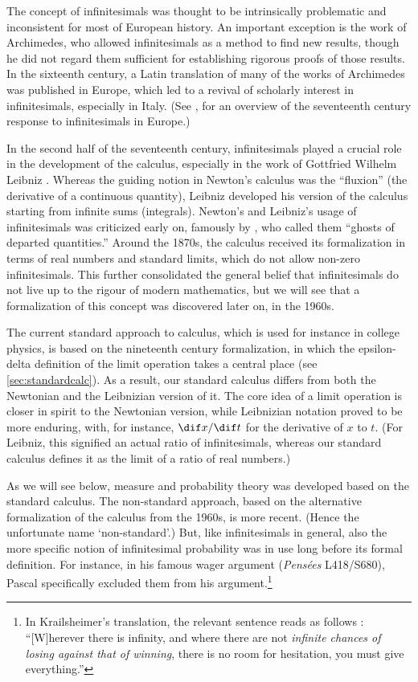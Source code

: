 The concept of infinitesimals was thought to be intrinsically problematic and inconsistent for most of European history. An important exception is the work of Archimedes, who allowed infinitesimals as a method to find new results, though he did not regard them sufficient for establishing rigorous proofs of those results. In the sixteenth century, a Latin translation of many of the works of Archimedes was published in Europe, which led to a revival of scholarly interest in infinitesimals, especially in Italy. (See \citealp{Alexander:2014}, for an overview of the seventeenth century response to infinitesimals in Europe.)

In the second half of the seventeenth century, infinitesimals played a crucial role in the development of the calculus, especially in the work of Gottfried Wilhelm Leibniz \citep[see, \textit{e.g.},][]{KatzSherry:2012a,KatzSherry:2013}.
Whereas the guiding notion in Newton's calculus was the ``fluxion'' (the derivative of a continuous quantity), Leibniz developed his version of the calculus starting from infinite sums (integrals). Newton's and Leibniz's usage of infinitesimals was criticized early on, famously by \citet{Berkeley:1734}, who called them ``ghosts of departed quantities.''
Around the 1870s, the calculus received its formalization in terms of real numbers and standard limits, which do not allow non-zero infinitesimals. This further consolidated the general belief that infinitesimals do not live up to the rigour of modern mathematics, but we will see that a formalization of this concept was discovered later on, in the 1960s.

The current standard approach to calculus, which is used for instance in college physics, is based on the nineteenth century formalization, in which the epsilon-delta definition of the limit operation takes a central place (see \autoref{sec:standardcalc}). As a result, our standard calculus differs from both the Newtonian and the Leibnizian version of it. The core idea of a limit operation is closer in spirit to the Newtonian version, while Leibnizian notation proved to be more enduring, with, for instance, $\dif x/\dif t$ for the derivative of $x$ to $t$. (For Leibniz, this signified an actual ratio of infinitesimals, whereas our standard calculus defines it as the limit of a ratio of real numbers.)

As we will see below, measure and probability theory was developed based on the standard calculus. The non-standard approach, based on the alternative formalization of the calculus from the 1960s, is more recent. (Hence the unfortunate name `non-standard'.) But, like infinitesimals in general, also the more specific notion of infinitesimal probability was in use long before its formal definition. For instance, in his famous wager argument (\textit{Pens{\'{e}}es} L418/S680), Pascal specifically excluded them from his argument.\footnote{In Krailsheimer's translation, the relevant sentence reads as follows \citep[p.~151, my emphasis]{Krailsheimer:1995}: ``[W]herever there is infinity, and where there are not \emph{infinite chances of losing against that of winning}, there is no room for hesitation, you must give everything.''}

